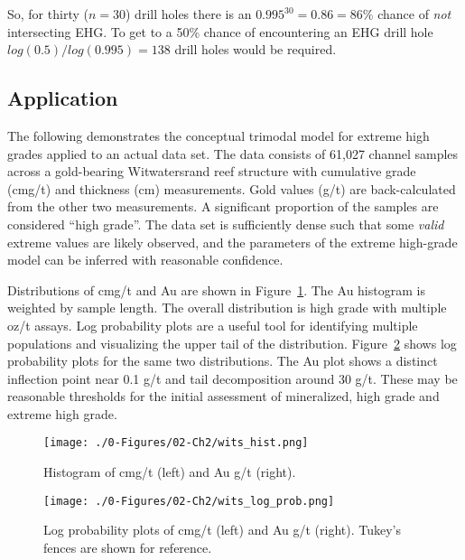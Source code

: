 So, for thirty ($n=30$) drill holes there is an $0.995^{30}=0.86=86\%$ chance of {\em not} intersecting EHG.  To get to a 50\% chance of encountering an EHG drill hole $log(0.5)/log(0.995)=138$ drill holes would be required.


\FloatBarrier
\subsection{Application}
\label{subsec:application}

The following demonstrates the conceptual trimodal model for extreme high grades applied to an actual data set. The data consists of 61,027 channel samples across a gold-bearing Witwatersrand reef structure with cumulative grade (cmg/t) and thickness (cm) measurements. Gold values (g/t) are back-calculated from the other two measurements. A significant proportion of the samples are considered ``high grade''. The data set is sufficiently dense such that some \emph{valid} extreme values are likely observed, and the parameters of the extreme high-grade model can be inferred with reasonable confidence.

Distributions of cmg/t and Au are shown in Figure~\ref{fig:wits_hist}. The Au histogram is weighted by sample length. The overall distribution is high grade with multiple oz/t assays. Log probability plots are a useful tool for identifying multiple populations and visualizing the upper tail of the distribution. Figure~\ref{fig:wits_log_prob} shows log probability plots for the same two distributions. The Au plot shows a distinct inflection point near 0.1 g/t and tail decomposition around 30 g/t. These may be reasonable thresholds for the initial assessment of mineralized, high grade and extreme high grade.

\begin{figure}[htb!]
    \centering
    \texttt{[image: ./0-Figures/02-Ch2/wits\_hist.png]}
    \caption{Histogram of cmg/t (left) and Au g/t (right).}
    \label{fig:wits_hist}
\end{figure}

\begin{figure}[htb!]
    \centering
    \texttt{[image: ./0-Figures/02-Ch2/wits\_log\_prob.png]}
    \caption{Log probability plots of cmg/t (left) and Au g/t (right). Tukey's fences are shown for reference.}
    \label{fig:wits_log_prob}
\end{figure}

